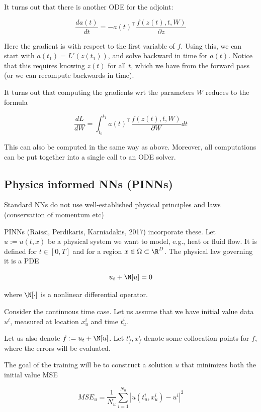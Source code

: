 \documentclass[english]{article}
\begin{document}
\item It turns out that there is another ODE for the adjoint: 

$$\frac{da(t)}{dt} = -a(t)^\top  \frac{f(z(t),t,W)}{\partial z} $$

Here the gradient is with respect to the first variable of $f$. Using this, we can start with $a(t_1) = L'(z(t_1))$, and solve backward in time for $a(t)$. Notice that this requires knowing $z(t)$ for all $t$, which we have from the forward pass (or we can recompute backwards in time).

\item It turns out that computing the gradients wrt the parameters $W$ reduces to the formula

$$\frac{dL}{dW} = \int_{t_0}^{t_1}  a(t)^\top  \frac{f(z(t),t,W)}{\partial W} dt$$

This can also be computed in the same way as above. Moreover, all computations can be put together into a single call to an ODE solver.
\eitem 


\subsection{Physics informed NNs (PINNs)}
%
\bitem
\item Standard NNs do not use well-established physical principles and laws (conservation of momentum etc)

\item PINNs (Raissi, Perdikaris, Karniadakis, 2017) incorporate these. Let $u:=u(t,x)$ be a physical system we want to model, e.g., heat or fluid flow. It is defined for $t\in[0,T]$ and for a region $x\in\Omega\subset \R^D$. The physical law governing it is a PDE

$$u_t +\N[u]=0$$

where $\N[\cdot]$ is a nonlinear differential operator.

\item Consider the continuous time case. Let us assume that we have initial value data $u^i$, measured at location $x_u^i$ and time $t_u^i$. 

Let us also denote $f:=u_t +\N[u]$. Let $t_f^i,x_f^i$ denote some collocation points for $f$, where the errors will be evaluated. 

The goal of the training will be to construct a solution $u$ that minimizes both the initial value MSE

$$MSE_u = \frac{1}{N_u}\sum_{i=1}^{N_u}|u(t_u^i,x_u^i)-u^i|^2$$
\end{document}
